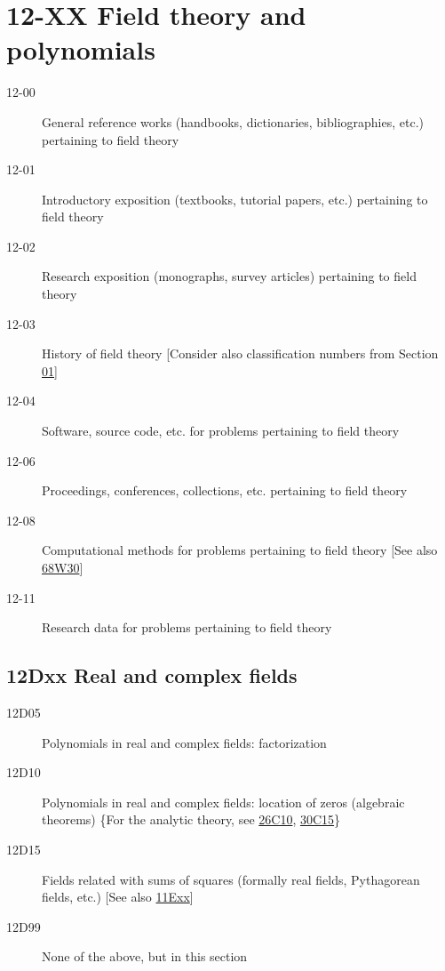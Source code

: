 \documentclass[letterpaper]{article}
\begin{document}
\section*{12-XX Field theory and polynomials }\label{12-XX}
\begin{description}
\item [12-00]\label{12-00} General reference works (handbooks, dictionaries, bibliographies, etc.) pertaining to field theory
\item [12-01]\label{12-01} Introductory exposition (textbooks, tutorial papers, etc.) pertaining to field theory
\item [12-02]\label{12-02} Research exposition (monographs, survey articles) pertaining to field theory
\item [12-03]\label{12-03} History of field theory [Consider also classification numbers from Section \hyperref[01-XX]{01}]
\item [12-04]\label{12-04} Software, source code, etc. for problems pertaining to field theory
\item [12-06]\label{12-06} Proceedings, conferences, collections, etc. pertaining to field theory
\item [12-08]\label{12-08} Computational methods for problems pertaining to field theory [See also \hyperref[68W30]{68W30}]
\item [12-11]\label{12-11} Research data for problems pertaining to field theory
\end{description}
\subsection*{12Dxx  Real and complex fields }\label{12Dxx}
\begin{description}  
\item [12D05]\label{12D05} Polynomials in real and complex fields: factorization
\item [12D10]\label{12D10} Polynomials in real and complex fields: location of zeros (algebraic theorems) \{For the analytic theory, see \hyperref[26C10]{26C10}, \hyperref[30C15]{30C15}\}
\item [12D15]\label{12D15} Fields related with sums of squares (formally real fields, Pythagorean fields, etc.) [See also \hyperref[11Exx]{11Exx}]
\item [12D99]\label{12D99} None of the above, but in this section
\end{description}
\end{document}
